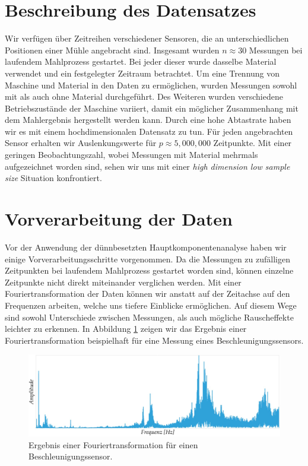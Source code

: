 \section{Beschreibung des Datensatzes}
\label{data_set}

Wir verfügen über Zeitreihen verschiedener Sensoren, 
die an unterschiedlichen Positionen einer Mühle angebracht sind. Insgesamt wurden $n \approx 30$ Messungen bei laufendem Mahlprozess gestartet. Bei jeder dieser wurde dasselbe Material verwendet und ein festgelegter Zeitraum betrachtet. Um eine Trennung von Maschine und Material in den Daten zu ermöglichen, wurden Messungen sowohl mit als auch ohne Material durchgeführt. Des Weiteren wurden verschiedene Betriebszustände der Maschine variiert, damit ein möglicher Zusammenhang mit dem Mahlergebnis hergestellt werden kann. Durch eine hohe Abtastrate haben wir es mit einem hochdimensionalen Datensatz zu tun. Für jeden angebrachten Sensor erhalten wir Auslenkungswerte für $p \approx 5,000,000$ Zeitpunkte. Mit einer geringen Beobachtungszahl, wobei Messungen mit Material mehrmals aufgezeichnet worden sind, sehen wir uns mit einer \textit{high dimension low sample size} Situation konfrontiert. 

\section{Vorverarbeitung der Daten}
\label{preprocessing}

Vor der Anwendung der dünnbesetzten Hauptkomponentenanalyse haben wir einige Vorverarbeitungsschritte vorgenommen. Da die Messungen zu zufälligen Zeitpunkten bei laufendem Mahlprozess gestartet worden sind, können einzelne Zeitpunkte nicht direkt miteinander verglichen werden. Mit einer Fouriertransformation der Daten können wir anstatt auf der Zeitachse auf den Frequenzen arbeiten, welche uns tiefere Einblicke ermöglichen. Auf diesem Wege sind sowohl Unterschiede zwischen Messungen, als auch mögliche Rauscheffekte leichter zu erkennen. In Abbildung \ref{fft_example} zeigen wir das Ergebnis einer Fouriertransformation beispielhaft für eine Messung eines Beschleunigungssensors.

\begin{figure}
\centering
\includegraphics[width=\textwidth]{figures/Signal_5_fft_example_new.jpg}
\caption{Ergebnis einer Fouriertransformation für einen Beschleunigungssensor.}
\label{fft_example}
\end{figure}

